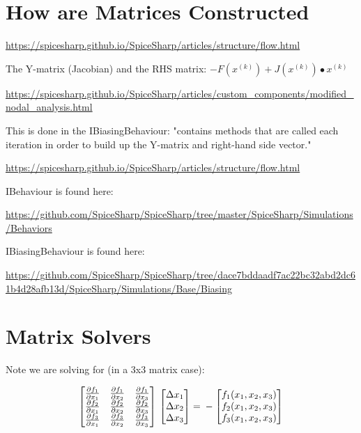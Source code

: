 \documentclass[12pt]{article}
\renewcommand{\_}{\kern-1.5pt\textunderscore\kern-1.5pt}
\begin{document}
\part{How are Matrices Constructed}


\url{https://spicesharp.github.io/SpiceSharp/articles/structure/flow.html}

The Y-matrix (Jacobian) and the RHS matrix: \textbf{$-F(x^{(k)}) + J(x^{(k)}) \bullet x^{(k)}$}

\url{https://spicesharp.github.io/SpiceSharp/articles/custom_components/modified_nodal_analysis.html}

This is done in the IBiasingBehaviour: "contains methods that are called each iteration in order to build up the Y-matrix and right-hand side vector."

\url{https://spicesharp.github.io/SpiceSharp/articles/structure/flow.html}

IBehaviour is found here:

\url{https://github.com/SpiceSharp/SpiceSharp/tree/master/SpiceSharp/Simulations/Behaviors}

IBiasingBehaviour is found here:

\url{https://github.com/SpiceSharp/SpiceSharp/tree/dace7bddaadf7ac22bc32abd2dc61b4d28afb13d/SpiceSharp/Simulations/Base/Biasing}



\part{Matrix Solvers}
Note we are solving for (in a 3x3 matrix case):

$$ \begin{bmatrix}
\frac{\partial f_1}{\partial x_1}  & \frac{\partial f_1}{\partial x_2}  & \frac{\partial f_1}{\partial x_3} \\
\frac{\partial f_2}{\partial x_1}  & \frac{\partial f_2}{\partial x_2}  & \frac{\partial f_2}{\partial x_3} \\
\frac{\partial f_3}{\partial x_1}  & \frac{\partial f_3}{\partial x_2}  & \frac{\partial f_3}{\partial x_3} 
\end{bmatrix} \\ 
\begin{bmatrix}
\Delta x_1 \\
\Delta x_2 \\
\Delta x_3
\end{bmatrix} = \\
-\begin{bmatrix}
f_1 (x_1,x_2,x_3) \\
f_2 (x_1,x_2,x_3) \\
f_3 (x_1,x_2,x_3)
\end{bmatrix}
$$
\end{document}
